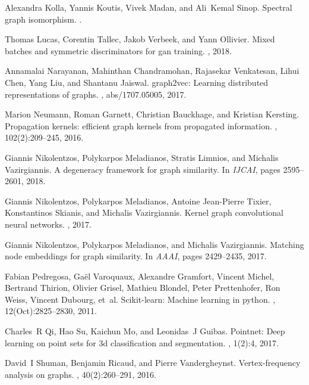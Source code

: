 \documentclass{article}
\begin{document}
\begin{thebibliography}{10}
Alexandra Kolla, Yannis Koutis, Vivek Madan, and Ali~Kemal Sinop.
\newblock Spectral graph isomorphism.
.

Thomas Lucas, Corentin Tallec, Jakob Verbeek, and Yann Ollivier.
\newblock Mixed batches and symmetric discriminators for gan training.
, 2018.

Annamalai Narayanan, Mahinthan Chandramohan, Rajasekar Venkatesan, Lihui Chen,
  Yang Liu, and Shantanu Jaiswal.
\newblock graph2vec: Learning distributed representations of graphs.
, abs/1707.05005, 2017.

Marion Neumann, Roman Garnett, Christian Bauckhage, and Kristian Kersting.
\newblock Propagation kernels: efficient graph kernels from propagated
  information.
, 102(2):209--245, 2016.

Giannis Nikolentzos, Polykarpos Meladianos, Stratis Limnios, and Michalis
  Vazirgiannis.
\newblock A degeneracy framework for graph similarity.
\newblock In {\em IJCAI}, pages 2595--2601, 2018.

Giannis Nikolentzos, Polykarpos Meladianos, Antoine Jean-Pierre Tixier,
  Konstantinos Skianis, and Michalis Vazirgiannis.
\newblock Kernel graph convolutional neural networks.
, 2017.

Giannis Nikolentzos, Polykarpos Meladianos, and Michalis Vazirgiannis.
\newblock Matching node embeddings for graph similarity.
\newblock In {\em AAAI}, pages 2429--2435, 2017.

Fabian Pedregosa, Ga{\"e}l Varoquaux, Alexandre Gramfort, Vincent Michel,
  Bertrand Thirion, Olivier Grisel, Mathieu Blondel, Peter Prettenhofer, Ron
  Weiss, Vincent Dubourg, et~al.
\newblock Scikit-learn: Machine learning in python.
, 12(Oct):2825--2830, 2011.

Charles~R Qi, Hao Su, Kaichun Mo, and Leonidas~J Guibas.
\newblock Pointnet: Deep learning on point sets for 3d classification and
  segmentation.
,
  1(2):4, 2017.

David~I Shuman, Benjamin Ricaud, and Pierre Vandergheynst.
\newblock Vertex-frequency analysis on graphs.
, 40(2):260--291,
  2016.


\end{thebibliography}
\end{document}
